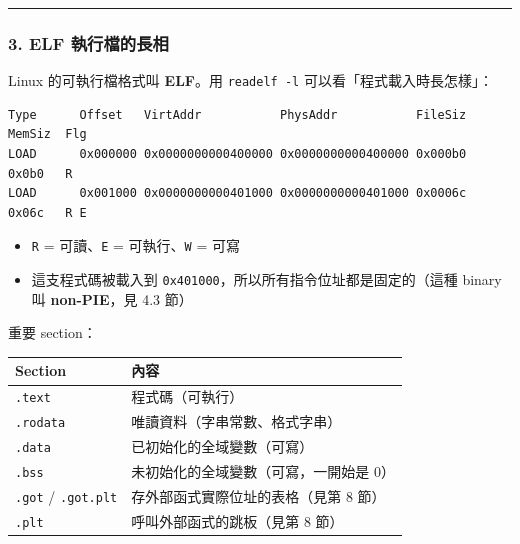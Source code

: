\documentclass[10pt,a4paper]{article}
\newcounter{none}
\providecommand{\tightlist}{%
  \setlength{\itemsep}{0pt}\setlength{\parskip}{0pt}}
\begin{document}
\begin{center}\rule{0.5\linewidth}{0.5pt}\end{center}

\subsubsection{3. ELF
執行檔的長相}\label{elf-ux57f7ux884cux6a94ux7684ux9577ux76f8}

Linux 的可執行檔格式叫 \textbf{ELF}。用 \texttt{readelf\ \allowbreak{}-\allowbreak{}l}
可以看「程式載入時長怎樣」：

\begin{Verbatim}[breaklines=true,breakanywhere=true,breakautoindent=false,fontsize=\fontsize{7.0}{9.5}\selectfont]
Type      Offset   VirtAddr           PhysAddr           FileSiz  MemSiz  Flg
LOAD      0x000000 0x0000000000400000 0x0000000000400000 0x000b0  0x0b0   R
LOAD      0x001000 0x0000000000401000 0x0000000000401000 0x0006c  0x06c   R E
\end{Verbatim}

\begin{itemize}
\tightlist
\item
  \texttt{R} = 可讀、\texttt{E} = 可執行、\texttt{W} = 可寫
\item
  這支程式碼被載入到 \texttt{0x401000}，所以所有指令位址都是固定的（這種
  binary 叫 \textbf{non-PIE}，見 4.3 節）
\end{itemize}

重要 section：

{\def\LTcaptype{none} %
\begin{longtable}[]{@{}ll@{}}
\toprule\noalign{}
Section & 內容 \\
\midrule\noalign{}
\endhead
\bottomrule\noalign{}
\endlastfoot
\texttt{.\allowbreak{}text} & 程式碼（可執行） \\
\texttt{.\allowbreak{}rodata} & 唯讀資料（字串常數、格式字串） \\
\texttt{.\allowbreak{}data} & 已初始化的全域變數（可寫） \\
\texttt{.\allowbreak{}bss} & 未初始化的全域變數（可寫，一開始是 0） \\
\texttt{.\allowbreak{}got} / \texttt{.\allowbreak{}got.\allowbreak{}plt} & 存外部函式實際位址的表格（見第 8
節） \\
\texttt{.\allowbreak{}plt} & 呼叫外部函式的跳板（見第 8 節） \\
\end{longtable}
}
\end{document}
